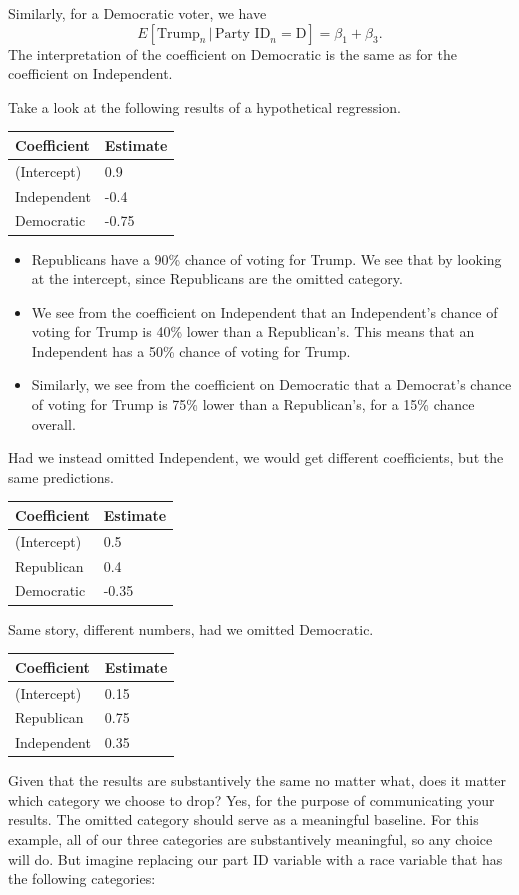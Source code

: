 \documentclass[
  12pt,
  oneside,openany]{book}
\begin{document}
Similarly, for a Democratic voter, we have
\[
E[\text{Trump}_n \,|\, \text{Party ID}_n = \text{D}] = \beta_1 + \beta_3.
\]
The interpretation of the coefficient on Democratic is the same as for the coefficient on Independent.

Take a look at the following results of a hypothetical regression.

\begin{longtable}[]{@{}ll@{}}
\toprule
Coefficient & Estimate\tabularnewline
\midrule
\endhead
(Intercept) & 0.9\tabularnewline
Independent & -0.4\tabularnewline
Democratic & -0.75\tabularnewline
\bottomrule
\end{longtable}

\begin{itemize}
\item
  Republicans have a 90\% chance of voting for Trump. We see that by looking at the intercept, since Republicans are the omitted category.
\item
  We see from the coefficient on Independent that an Independent's chance of voting for Trump is 40\% lower than a Republican's. This means that an Independent has a 50\% chance of voting for Trump.
\item
  Similarly, we see from the coefficient on Democratic that a Democrat's chance of voting for Trump is 75\% lower than a Republican's, for a 15\% chance overall.
\end{itemize}

Had we instead omitted Independent, we would get different coefficients, but the same predictions.

\begin{longtable}[]{@{}ll@{}}
\toprule
Coefficient & Estimate\tabularnewline
\midrule
\endhead
(Intercept) & 0.5\tabularnewline
Republican & 0.4\tabularnewline
Democratic & -0.35\tabularnewline
\bottomrule
\end{longtable}

Same story, different numbers, had we omitted Democratic.

\begin{longtable}[]{@{}ll@{}}
\toprule
Coefficient & Estimate\tabularnewline
\midrule
\endhead
(Intercept) & 0.15\tabularnewline
Republican & 0.75\tabularnewline
Independent & 0.35\tabularnewline
\bottomrule
\end{longtable}

Given that the results are substantively the same no matter what, does it matter which category we choose to drop? Yes, for the purpose of communicating your results. The omitted category should serve as a meaningful baseline. For this example, all of our three categories are substantively meaningful, so any choice will do. But imagine replacing our part ID variable with a race variable that has the following categories:
\end{document}
